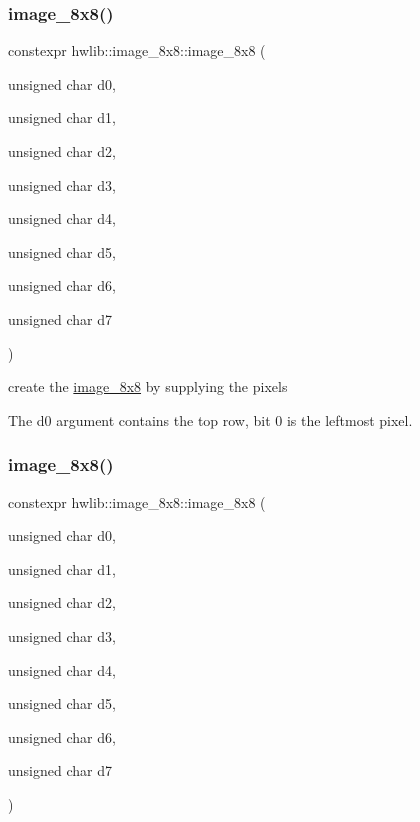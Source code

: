 \subsubsection{\texorpdfstring{image\+\_\+8x8()}{image\_8x8()}\hspace{0.1cm}{\footnotesize\ttfamily [1/2]}}
{\footnotesize\ttfamily constexpr hwlib\+::image\+\_\+8x8\+::image\+\_\+8x8 (\begin{DoxyParamCaption}\item[{unsigned char}]{d0,  }\item[{unsigned char}]{d1,  }\item[{unsigned char}]{d2,  }\item[{unsigned char}]{d3,  }\item[{unsigned char}]{d4,  }\item[{unsigned char}]{d5,  }\item[{unsigned char}]{d6,  }\item[{unsigned char}]{d7 }\end{DoxyParamCaption})\hspace{0.3cm}{\ttfamily [inline]}}



create the \hyperlink{classhwlib_1_1image__8x8}{image\+\_\+8x8} by supplying the pixels 

The d0 argument contains the top row, bit 0 is the leftmost pixel. \mbox{\label{classhwlib_1_1image__8x8_a9384d60dbb742e96c3c03792545fbd56}} 
\subsubsection{\texorpdfstring{image\+\_\+8x8()}{image\_8x8()}\hspace{0.1cm}{\footnotesize\ttfamily [2/2]}}
{\footnotesize\ttfamily constexpr hwlib\+::image\+\_\+8x8\+::image\+\_\+8x8 (\begin{DoxyParamCaption}\item[{unsigned char}]{d0,  }\item[{unsigned char}]{d1,  }\item[{unsigned char}]{d2,  }\item[{unsigned char}]{d3,  }\item[{unsigned char}]{d4,  }\item[{unsigned char}]{d5,  }\item[{unsigned char}]{d6,  }\item[{unsigned char}]{d7 }\end{DoxyParamCaption})\hspace{0.3cm}{\ttfamily [inline]}}

